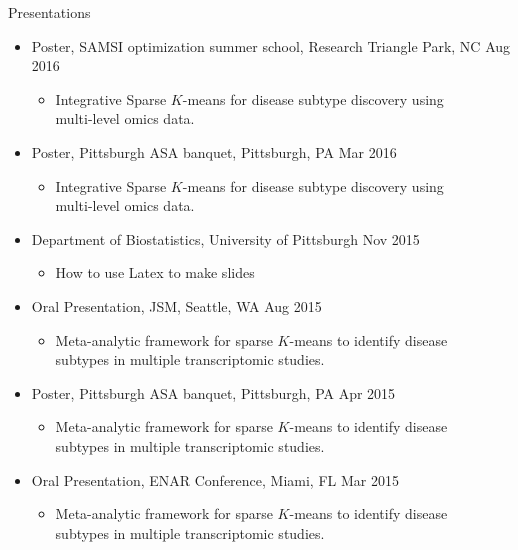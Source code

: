 \documentclass{resume} %
\begin{document}
\begin{rSection}{Presentations}
\begin{itemize}[noitemsep,topsep=0pt]
\item Poster, SAMSI optimization summer school,  Research Triangle Park, NC  \hfill {Aug 2016}
\begin{itemize}[noitemsep,topsep=0pt]
\item{Integrative Sparse $K$-means for disease subtype discovery using \\multi-level omics data.}
\end{itemize}

\item Poster, Pittsburgh ASA banquet, Pittsburgh, PA \hfill {Mar 2016}
\begin{itemize}[noitemsep,topsep=0pt]
\item{Integrative Sparse $K$-means for disease subtype discovery using \\multi-level omics data.}
\end{itemize}

\item Department of Biostatistics, University of Pittsburgh  \hfill Nov 2015
\begin{itemize}[noitemsep,topsep=0pt]
\item{How to use Latex to make slides}
\end{itemize}

\item Oral Presentation, JSM, Seattle, WA \hfill {Aug 2015}
\begin{itemize}[noitemsep,topsep=0pt]
\item{Meta-analytic framework for sparse $K$-means to identify disease\\ subtypes in multiple transcriptomic studies.}
\end{itemize}

\item Poster, Pittsburgh ASA banquet, Pittsburgh, PA \hfill {Apr 2015}
\begin{itemize}[noitemsep,topsep=0pt]
\item{Meta-analytic framework for sparse $K$-means to identify disease\\ subtypes in multiple transcriptomic studies.}
\end{itemize}

\item Oral Presentation, ENAR Conference, Miami, FL \hfill {Mar 2015}
\begin{itemize}[noitemsep,topsep=0pt]
\item{Meta-analytic framework for sparse $K$-means to identify disease\\ subtypes in multiple transcriptomic studies.}
\end{itemize}


\end{itemize}
\end{rSection}
\end{document}
